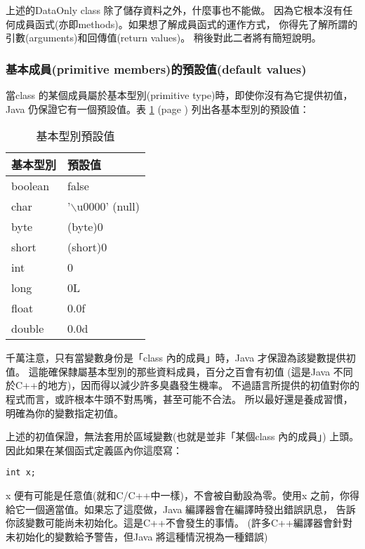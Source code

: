 上述的DataOnly class 除了儲存資料之外，什麼事也不能做。
因為它根本沒有任何成員函式(亦即methods)。如果想了解成員函式的運作方式，
你得先了解所謂的引數(arguments)和回傳值(return values)。
稍後對此二者將有簡短說明。
\subsubsection{基本成員(primitive members)的預設值(default values)}
當class 的某個成員屬於基本型別(primitive type)時，即使你沒有為它提供初值，
Java 仍保證它有一個預設值。表 \ref{primitive} (page \pageref{primitive})
列出各基本型別的預設值：


\begin{table}[htbp]
\center
\begin{tabular}{ll}
\toprule
基本型別 & 預設值 \\
\midrule
boolean & false \\
\midrule
char & '$\backslash$u0000' (null) \\
\midrule
byte & (byte)0 \\
\midrule
short & (short)0 \\
\midrule
int & 0 \\
\midrule
long & 0L \\
\midrule
float & 0.0f \\
\midrule
double & 0.0d \\
\bottomrule
\end{tabular}
\caption{基本型別預設值}\label{primitive}
\end{table}

千萬注意，只有當變數身份是「class 內的成員」時，Java 才保證為該變數提供初值。
這能確保隸屬基本型別的那些資料成員，百分之百會有初值
(這是Java 不同於C++的地方)，因而得以減少許多臭蟲發生機率。
不過語言所提供的初值對你的程式而言，或許根本牛頭不對馬嘴，甚至可能不合法。
所以最好還是養成習慣，明確為你的變數指定初值。

上述的初值保證，無法套用於區域變數(也就是並非「某個class 內的成員」)
上頭。因此如果在某個函式定義區內你這麼寫：

\begin{Verbatim}[frame=single]
int x;
\end{Verbatim}

x 便有可能是任意值(就和C/C++中一樣)，不會被自動設為零。使用x
之前，你得給它一個適當值。如果忘了這麼做，Java 編譯器會在編譯時發出錯誤訊息，
告訴你該變數可能尚未初始化。這是C++不會發生的事情。
(許多C++編譯器會針對未初始化的變數給予警告，但Java 將這種情況視為一種錯誤)

